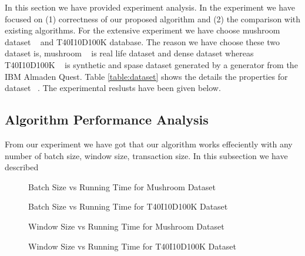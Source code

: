 In this section we have provided experiment analysis. In the experiment we have focused on (1) correctness of our proposed algorithm and (2) the comparison with existing algorithms. For the extensive experiment we have choose mushroom dataset ~\cite{dataset} and T40I10D100K database. The reason we have choose these two dataset is, mushroom ~\cite{dataset} is real life dataset and dense dataset whereas T40I10D100K ~\cite{dataset} is synthetic and spase dataset generated by a generator from the IBM Almaden Quest. Table \ref{table:dataset} shows the details the properties for dataset ~\cite{dataset}. The experimental reslusts have been given below.
\subsection{Algorithm Performance Analysis}
	From our experiment we have got that our algorithm works effeciently with any number of batch size, window size, transaction size. In this subsection we have described
		\begin{figure}[h]
		\centering
			
		\caption{Batch Size vs Running Time for Mushroom Dataset ~\cite{dataset}}
		\label{result:g_m_const_batch}
		\end{figure}
		\begin{figure}[h]
		\centering
			
		\caption{Batch Size vs Running Time for T40I10D100K Dataset ~\cite{dataset}}
		\label{result:g_t10_const_batch}
		\end{figure}
		\begin{figure}[h]
		\centering
			
		\caption{Window Size vs Running Time for Mushroom Dataset ~\cite{dataset}}
		\label{result:g_m_const_win}
		\end{figure}
		\begin{figure}[h]
		\centering
			
		\caption{Window Size vs Running Time for T40I10D100K Dataset ~\cite{dataset}}
		\label{result:g_t10_const_win}
		\end{figure}
